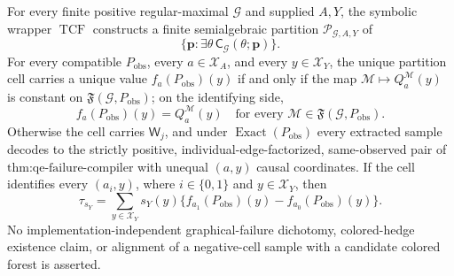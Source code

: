 For every finite positive regular-maximal \(\mathcal G\) and supplied \(A,Y\), the symbolic wrapper \(\operatorname{TCF}\) constructs a finite semialgebraic partition \(\mathscr P_{\mathcal G,A,Y}\) of
\[
\{\mathbf p:\exists\theta\,\mathsf C_{\mathcal G}(\theta;\mathbf p)\}.
\]
For every compatible \(P_{\mathrm{obs}}\), every \(a\in\mathcal X_A\), and every \(y\in\mathcal X_Y\), the unique partition cell carries a unique value \(f_a(P_{\mathrm{obs}})(y)\) if and only if the map \(\mathcal M\mapsto Q_a^{\mathcal M}(y)\) is constant on \(\mathfrak F(\mathcal G,P_{\mathrm{obs}})\); on the identifying side,
\[
f_a(P_{\mathrm{obs}})(y)=Q_a^{\mathcal M}(y)
\quad\text{for every }\mathcal M\in\mathfrak F(\mathcal G,P_{\mathrm{obs}}).
\]
Otherwise the cell carries \(\mathsf W_j\), and under \(\operatorname{Exact}(P_{\mathrm{obs}})\) every extracted sample decodes to the strictly positive, individual-edge-factorized, same-observed pair of \(\text{thm:qe-failure-compiler}\) with unequal \((a,y)\) causal coordinates. If the cell identifies every \((a_i,y)\), where \(i\in\{0,1\}\) and \(y\in\mathcal X_Y\), then
\[
\tau_{s_Y}=\sum_{y\in\mathcal X_Y}s_Y(y)\{f_{a_1}(P_{\mathrm{obs}})(y)-f_{a_0}(P_{\mathrm{obs}})(y)\}.
\]
No implementation-independent graphical-failure dichotomy, colored-hedge existence claim, or alignment of a negative-cell sample with a candidate colored forest is asserted.